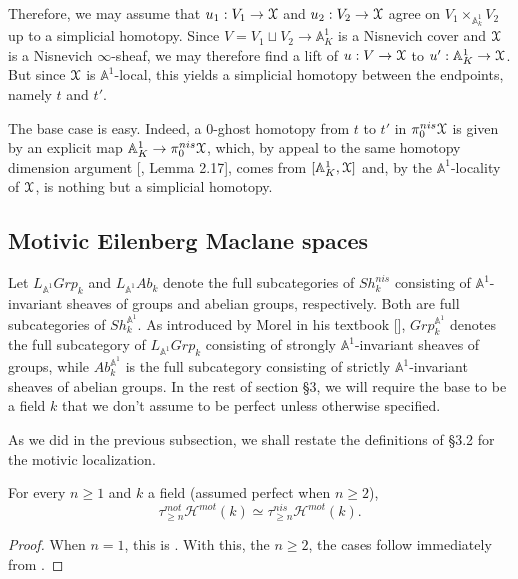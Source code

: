 \begin{rem}
Therefore, we may assume that $u_1:V_1\to \EuScript{X}$ and $u_2: V_2\to \EuScript{X}$ agree on $V_1\times_{\mathbb{A}^1_k}V_2$ up to a simplicial homotopy. Since $V=V_1\sqcup V_2\to \mathbb{A}^1_K$ is a Nisnevich cover and $\EuScript{X}$ is a Nisnevich $\infty$-sheaf, we may therefore find a lift of $u: V\to \EuScript{X}$ to $u': \mathbb{A}^1_K\to \EuScript{X}$. But since $\EuScript{X}$ is $\mathbb{A}^1$-local, this yields a simplicial homotopy between the endpoints, namely $t$ and $t'$. 

The base case is easy. Indeed, a $0$-ghost homotopy from $t$ to $t'$ in $\pi_0^{nis}\EuScript{X}$ is given by an explicit map $\mathbb{A}^1_K\to \pi_0^{nis}\EuScript{X}$, which, by appeal to the same homotopy dimension argument [\cite{bachmann2024strongly}, Lemma 2.17], comes from $[\mathbb{A}^1_K, \EuScript{X}]$ and, by the $\mathbb{A}^1$-locality of $\EuScript{X}$, is nothing but a simplicial homotopy.

\end{rem}
\subsection{Motivic Eilenberg Maclane spaces}
Let $L_{\mathbb{A}^1}Grp_k$ and $L_{\mathbb{A}^1}Ab_k$ denote the full subcategories of $Sh^{nis}_k$ consisting of $\mathbb{A}^1$-invariant sheaves of groups and abelian groups, respectively. Both are full subcategories of $Sh^{\mathbb{A}^1}_k$. As introduced by Morel in his textbook [\cite{morel2012a1}], $Grp_k^{\mathbb{A}^1}$ denotes the full subcategory of $L_{\mathbb{A}^1}Grp_k$ consisting of strongly $\mathbb{A}^1$-invariant sheaves of groups, while $Ab_k^{\mathbb{A}^1}$ is the full subcategory consisting of strictly $\mathbb{A}^1$-invariant sheaves of abelian groups. In the rest of section \S3, we will require the base to be a field $k$ that we don't assume to be perfect unless otherwise specified.

As we did in the previous subsection, we shall restate the definitions of \S3.2 for the motivic localization. 

\begin{thm}\label{nis connective vs mot connective of motivic spaces}
    For every $n\geq 1$ and $k$ a field (assumed perfect when $n\geq 2$), $$\tau_{\geq n}^{mot}\mathcal{H}^{mot}(k)\simeq \tau_{\geq n}^{nis}\mathcal{H}^{mot}(k).$$ 
\end{thm} 
\begin{proof}
    When $n=1$, this is . With this, the $n \geq 2$, the cases follow immediately from .
\end{proof}

